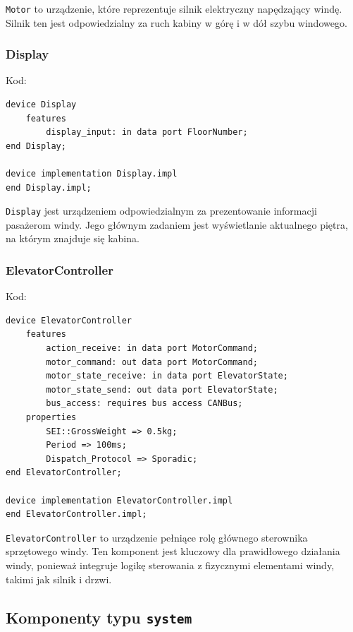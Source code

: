 \documentclass{article}
\begin{document}
    \texttt{Motor} to urządzenie, które reprezentuje silnik elektryczny napędzający windę. Silnik ten jest odpowiedzialny za ruch kabiny w górę i w dół szybu windowego.



    \subsubsection{Display}

    Kod:
    
    \begin{lstlisting}[basicstyle=\ttfamily, keywordstyle=\bfseries]
device Display
    features
        display_input: in data port FloorNumber; 
end Display;

device implementation Display.impl
end Display.impl;
    \end{lstlisting}

    \texttt{Display} jest urządzeniem odpowiedzialnym za prezentowanie informacji pasażerom windy. Jego głównym zadaniem jest wyświetlanie aktualnego piętra, na którym znajduje się kabina. 


    \subsubsection{ElevatorController}

    Kod:
    
    \begin{lstlisting}[basicstyle=\ttfamily, keywordstyle=\bfseries]
device ElevatorController
    features
        action_receive: in data port MotorCommand;
        motor_command: out data port MotorCommand;
        motor_state_receive: in data port ElevatorState;
        motor_state_send: out data port ElevatorState;
        bus_access: requires bus access CANBus;
    properties
        SEI::GrossWeight => 0.5kg;
        Period => 100ms;
        Dispatch_Protocol => Sporadic;
end ElevatorController;

device implementation ElevatorController.impl
end ElevatorController.impl;
    \end{lstlisting}

    \texttt{ElevatorController}  to urządzenie pełniące rolę głównego sterownika sprzętowego windy. Ten komponent jest kluczowy dla prawidłowego działania windy, ponieważ integruje logikę sterowania z fizycznymi elementami windy, takimi jak silnik i drzwi.




    \subsection{Komponenty typu \texttt{system}}
\end{document}
